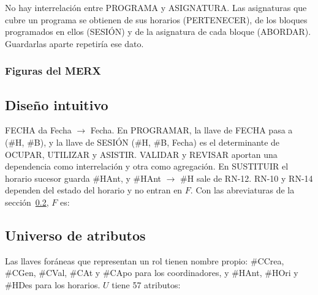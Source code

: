 No hay interrelación entre PROGRAMA y ASIGNATURA. Las asignaturas que cubre un programa se obtienen de sus horarios (PERTENECER), de los bloques programados en ellos (SESIÓN) y de la asignatura de cada bloque (ABORDAR). Guardarlas aparte repetiría ese dato.

\subsubsection{Figuras del MERX}


\FloatBarrier
\subsection{Diseño intuitivo}\label{sec:intuitivo}

FECHA da Fecha $\to$ Fecha. En PROGRAMAR, la llave de FECHA pasa a (\#H, \#B), y la llave de SESIÓN (\#H, \#B, Fecha) es el determinante de OCUPAR, UTILIZAR y ASISTIR. VALIDAR y REVISAR aportan una dependencia como interrelación y otra como agregación. En SUSTITUIR el horario sucesor guarda \#HAnt, y \#HAnt $\to$ \#H sale de RN-12. RN-10 y RN-14 dependen del estado del horario y no entran en $F$. Con las abreviaturas de la sección~\ref{sec:universo}, $F$ es:



\subsection{Universo de atributos}\label{sec:universo}

Las llaves foráneas que representan un rol tienen nombre propio: \#CCrea, \#CGen, \#CVal, \#CAt y \#CApo para los coordinadores, y \#HAnt, \#HOri y \#HDes para los horarios. $U$ tiene 57 atributos:



